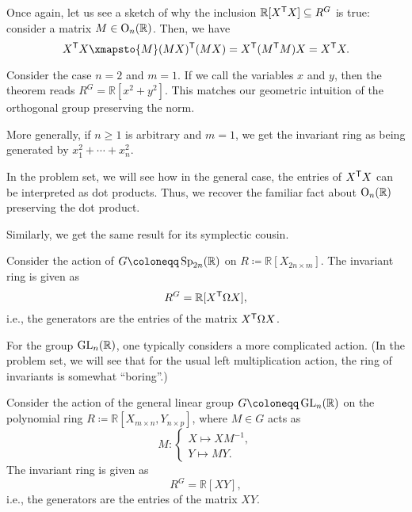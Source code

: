 \documentclass[12pt]{article}
\begin{document}
	Once again, let us see a sketch of why the inclusion 
	$\mathbb{R}[X^{\mathsf{T}} X] \subseteq R^{G}$ is true: 
	consider a matrix $M \in \operatorname{O}_{n}(\mathbb{R})$. 
	Then, we have
	\begin{equation*} 
		X^{\trans} X \xmapsto{M} (M X)^{\trans} (M X) 
		= X^{\trans} (M^{\trans} M) X
		= X^{\trans} X.
	\end{equation*}

	\begin{ex}
		Consider the case $n = 2$ and $m = 1$. 
		If we call the variables $x$ and $y$, then the theorem reads $R^{G} = \mathbb{R}[x^{2} + y^{2}]$. 
		This matches our geometric intuition of the orthogonal group preserving the norm. 

		More generally, if $n \ge 1$ is arbitrary and $m = 1$, we get the invariant ring as being generated by $x_{1}^{2} + \cdots + x_{n}^{2}$. 

		In the problem set, we will see how in the general case, the entries of $X^{\mathsf{T}} X$ can be interpreted as dot products. 
		Thus, we recover the familiar fact about $\operatorname{O}_{n}(\mathbb{R})$ preserving the dot product.
	\end{ex}

	Similarly, we get the same result for its symplectic cousin.

	\begin{thm}
		Consider the action of $G \coloneqq \Sp_{2n}(\mathbb{R})$ on $R \coloneqq \mathbb{R}[X_{2n \times m}]$. 
		The invariant ring is given as
		\begin{equation*} 
			R^{G} = \mathbb{R}[X^{\mathsf{T}} \Omega X],
		\end{equation*}
		i.e., the generators are the entries of the matrix $X^{\mathsf{T}} \Omega X$.
	\end{thm}

	For the group $\operatorname{GL}_{n}(\mathbb{R})$, one typically considers a more complicated action. 
	(In the problem set, we will see that for the usual left multiplication action, the ring of invariants is somewhat ``boring''.)

	\begin{thm}
		Consider the action of the general linear group $G \coloneqq \GL_{n}(\mathbb{R})$ on the polynomial ring 
		$R \coloneqq \mathbb{R}[X_{m \times n}, Y_{n \times p}]$, 
		where $M \in G$ acts as
		\begin{equation*} 
			M \colon 
			\begin{cases}
				X \mapsto X M^{-1}, \\
				Y \mapsto M Y.
			\end{cases}
		\end{equation*}
		The invariant ring is given as
		\begin{equation*} 
			R^{G} = \mathbb{R}[X Y],
		\end{equation*}
		i.e., the generators are the entries of the matrix $X Y$.
	\end{thm}
\end{document}
